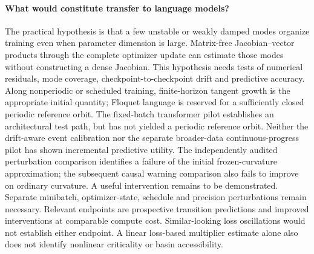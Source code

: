 \documentclass[11pt,letterpaper]{article}
\begin{document}
\paragraph{What would constitute transfer to language models?} The practical hypothesis is that a few
unstable or weakly damped modes organize training even when parameter dimension is large. Matrix-free
Jacobian--vector products through the complete optimizer update can estimate those modes without constructing a
dense Jacobian. This hypothesis needs tests of numerical residuals, mode coverage, checkpoint-to-checkpoint drift
and predictive accuracy. Along nonperiodic or scheduled training, finite-horizon tangent growth is the appropriate
initial quantity; Floquet language is reserved for a sufficiently closed periodic reference orbit.
The fixed-batch transformer pilot establishes an architectural test path, but has not yielded a periodic reference
orbit. Neither the drift-aware event calibration nor the separate broader-data continuous-progress pilot has
shown incremental predictive utility. The independently audited perturbation comparison identifies a failure of the initial frozen-curvature approximation; the subsequent causal warning comparison also fails to improve on ordinary curvature. A useful intervention remains to be demonstrated. Separate
minibatch, optimizer-state, schedule and precision perturbations remain necessary. Relevant endpoints are prospective transition predictions and improved interventions at comparable
compute cost. Similar-looking loss oscillations would not establish either endpoint. A linear loss-based
multiplier estimate alone also does not identify nonlinear criticality or basin accessibility.
\end{document}
